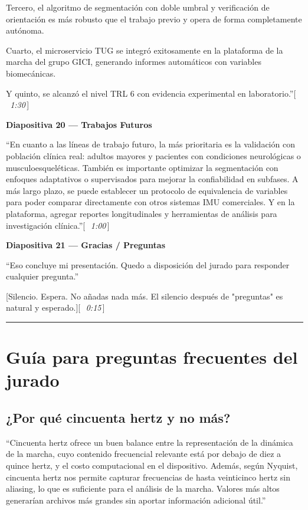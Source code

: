 \documentclass[12pt]{article}
\newcommand{\diap}[2]{%
  \begin{slidebox}
    \textbf{\color{slateblue}Diapositiva #1 — #2}
  \end{slidebox}%
}
\newcommand{\tiempo}[1]{\hfill{\small\color{timebox}[\,\textit{~#1}\,]}}
\begin{document}
Tercero, el algoritmo de segmentación con doble umbral y verificación de orientación es más robusto que el trabajo previo y opera de forma completamente autónoma.

Cuarto, el microservicio TUG se integró exitosamente en la plataforma de la marcha del grupo GICI, generando informes automáticos con variables biomecánicas.

Y quinto, se alcanzó el nivel TRL 6 con evidencia experimental en laboratorio.''\tiempo{1:30}

\diap{20}{Trabajos Futuros}

``En cuanto a las líneas de trabajo futuro, la más prioritaria es la validación con población clínica real: adultos mayores y pacientes con condiciones neurológicas o musculoesqueléticas. También es importante optimizar la segmentación con enfoques adaptativos o supervisados para mejorar la confiabilidad en subfases. A más largo plazo, se puede establecer un protocolo de equivalencia de variables para poder comparar directamente con otros sistemas IMU comerciales. Y en la plataforma, agregar reportes longitudinales y herramientas de análisis para investigación clínica.''\tiempo{1:00}

\diap{21}{Gracias / Preguntas}

``Eso concluye mi presentación. Quedo a disposición del jurado para responder cualquier pregunta.''

[Silencio. Espera. No añadas nada más. El silencio después de "preguntas" es natural y esperado.]\tiempo{0:15}

\vspace{1em}\hrule\vspace{1em}

\section*{Guía para preguntas frecuentes del jurado}

\subsection*{¿Por qué cincuenta hertz y no más?}

``Cincuenta hertz ofrece un buen balance entre la representación de la dinámica de la marcha, cuyo contenido frecuencial relevante está por debajo de diez a quince hertz, y el costo computacional en el dispositivo. Además, según Nyquist, cincuenta hertz nos permite capturar frecuencias de hasta veinticinco hertz sin aliasing, lo que es suficiente para el análisis de la marcha. Valores más altos generarían archivos más grandes sin aportar información adicional útil.''
\end{document}
